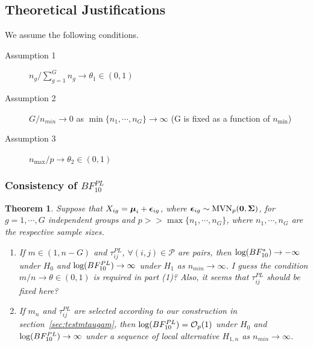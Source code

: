 \documentclass[times,sort&compress,3p]{elsarticle}
\theoremstyle{plain}%
\newtheorem{theorem}{Theorem}
\theoremstyle{definition}
\def\bzero{{\mathbf 0}}
\def\log{\hbox{log}}
\def\MVN{\hbox{MVN}}
\def\log{\hbox{log}}
\def\bzero{{\mathbf 0}}
\newcommand{\uepsilon}          {\mbox{\boldmath$\epsilon$}}
\newcommand{\umu}               {\mbox{\boldmath$\mu$}}
\newcommand{\uSigma}            {\mbox{\boldmath$\Sigma$}}
\begin{document}
\subsection{Theoretical Justifications} 
We assume the following conditions.
\begin{description}
  \item[Assumption 1] $n_g /\sum_{g=1}^{G}n_g \rightarrow \theta_1 \in (0, 1)$
  \item[Assumption 2] $G / n_{min} \rightarrow 0$ as $\min\{ n_1, \cdots, n_G \} \rightarrow \infty$ (G is fixed as a function of $n_{\min}$)
  \item[Assumption 3] $n_{\max}/p \rightarrow \theta_2 \in (0, 1)$ 
\end{description}

\subsubsection{Consistency of $BF_{10}^{PL}$}
\begin{theorem}\label{Thrm1}
Suppose that $X_{ig} = \umu_i + \uepsilon_{ig}$, where $\uepsilon_{ig} \sim \MVN_{p}(\bzero, \uSigma)$, for $g = 1, \cdots, G$ independent groups and $p >> \max\{n_1, \cdots, n_{G}\}$, where $n_1, \cdots, n_{G}$ are the respective sample sizes. %
\begin{enumerate}
    \item If $m \in (1, n - G)$ and $\tau^{PL}_{ij}$, $\forall (i,j) \in \mathcal{P}$ are pairs, then $\log(BF^{*}_{10}) \rightarrow -\infty$ under $H_0$ and $\log(BF^{PL}_{10}) \rightarrow \infty$ under $H_1$ as $n_{min} \rightarrow \infty$. {\color{blue}I guess the condition $m/n\to \theta\in (0, 1)$ is required in part (1)? Also, it seems that $\tau_{ij}^{PL}$ should be fixed here?}
    \item If 
    {\color{blue}$m_n$
    and $\tau^{PL}_{ij}$ are selected} according to our construction in section~\ref{sec:testmtaugam}, then $\log(BF^{PL}_{10}) = \mathcal{O}_{p}(1)$ under $H_0$ and $\log(BF^{PL}_{10}) \rightarrow \infty$ under a sequence of local alternative $H_{1,n}$ as $n_{min} \rightarrow \infty$.
\end{enumerate}
\end{theorem}
\end{document}
